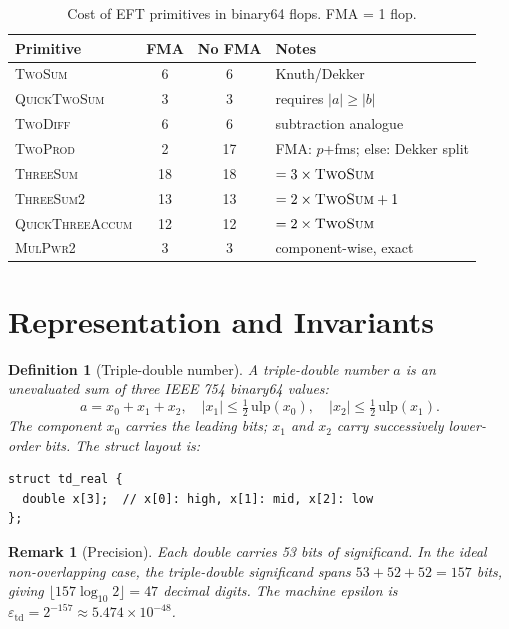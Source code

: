 \documentclass[11pt,a4paper]{article}
\newtheorem{definition}{Definition}
\newtheorem{remark}{Remark}
\begin{document}
\begin{table}[h]
\centering
\caption{Cost of EFT primitives in binary64 flops.
  FMA = 1 flop.}
\label{tab:eft-costs}
\begin{tabular}{lccl}
\toprule
Primitive & FMA & No FMA & Notes \\
\midrule
\textsc{TwoSum}          & 6  & 6  & Knuth/Dekker \\
\textsc{QuickTwoSum}     & 3  & 3  & requires $|a|\ge|b|$ \\
\textsc{TwoDiff}         & 6  & 6  & subtraction analogue \\
\textsc{TwoProd}         & 2  & 17 & FMA: $p$+fms; else: Dekker split \\
\textsc{ThreeSum}        & 18 & 18 & $= 3\times\textsc{TwoSum}$ \\
\textsc{ThreeSum2}       & 13 & 13 & $= 2\times\textsc{TwoSum}+1$ \\
\textsc{QuickThreeAccum} & 12 & 12 & $= 2\times\textsc{TwoSum}$ \\
\textsc{MulPwr2}         & 3  & 3  & component-wise, exact \\
\bottomrule
\end{tabular}
\end{table}


\section{Representation and Invariants}
\label{sec:representation}

\begin{definition}[Triple-double number]
A triple-double number $a$ is an unevaluated sum of three IEEE 754
binary64 values:
\begin{equation}
  a = x_0 + x_1 + x_2, \quad |x_1| \le \tfrac{1}{2}\,\mathrm{ulp}(x_0),
  \quad |x_2| \le \tfrac{1}{2}\,\mathrm{ulp}(x_1).
  \label{eq:td-rep}
\end{equation}
The component $x_0$ carries the leading bits; $x_1$ and $x_2$ carry
successively lower-order bits.  The struct layout is:
\begin{lstlisting}
struct td_real {
  double x[3];  // x[0]: high, x[1]: mid, x[2]: low
};
\end{lstlisting}
\end{definition}

\begin{remark}[Precision]
Each double carries 53 bits of significand.  In the ideal
non-overlapping case, the triple-double significand spans
$53 + 52 + 52 = 157$ bits, giving
$\lfloor 157 \log_{10} 2 \rfloor = 47$ decimal digits.
The machine epsilon is $\varepsilon_{\mathrm{td}} = 2^{-157}
\approx 5.474 \times 10^{-48}$.
\end{remark}
\end{document}
